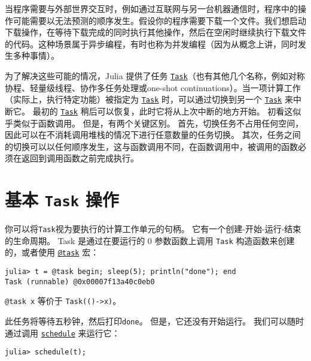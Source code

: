 当程序需要与外部世界交互时，例如通过互联网与另一台机器通信时，程序中的操作可能需要以无法预测的顺序发生。假设你的程序需要下载一个文件。我们想启动下载操作，在等待下载完成的同时执行其他操作，然后在空闲时继续执行下载文件的代码。这种场景属于异步编程，有时也称为并发编程（因为从概念上讲，同时发生多种事情）。



为了解决这些可能的情况，Julia 提供了任务 \hyperlink{7131243650304654155}{\texttt{Task}}（也有其他几个名称，例如对称协程、轻量级线程、协作多任务处理或one-shot continuations）。当一项计算工作（实际上，执行特定功能）被指定为 \hyperlink{7131243650304654155}{\texttt{Task}} 时，可以通过切换到另一个 \hyperlink{7131243650304654155}{\texttt{Task}} 来中断它。 最初的 \hyperlink{7131243650304654155}{\texttt{Task}} 稍后可以恢复，此时它将从上次中断的地方开始。 初看这似乎类似于函数调用。 但是，有两个关键区别。 首先，切换任务不占用任何空间，因此可以在不消耗调用堆栈的情况下进行任意数量的任务切换。 其次，任务之间的切换可以以任何顺序发生，这与函数调用不同，在函数调用中，被调用的函数必须在返回到调用函数之前完成执行。



\hypertarget{10912874536153090251}{}


\section{基本 \texttt{Task} 操作}



你可以将\texttt{Task}视为要执行的计算工作单元的句柄。 它有一个创建-开始-运行-结束的生命周期。 Task 是通过在要运行的 0 参数函数上调用 \texttt{Task} 构造函数来创建的，或者使用 \hyperlink{16142823989571622868}{\texttt{@task}} 宏：




\begin{verbatim}
julia> t = @task begin; sleep(5); println("done"); end
Task (runnable) @0x00007f13a40c0eb0
\end{verbatim}



\texttt{@task x} 等价于 \texttt{Task(()->x)}。



此任务将等待五秒钟，然后打印\texttt{done}。 但是，它还没有开始运行。 我们可以随时通过调用 \hyperlink{9185853093207176818}{\texttt{schedule}} 来运行它：




\begin{verbatim}
julia> schedule(t);
\end{verbatim}



